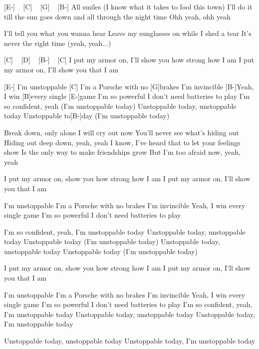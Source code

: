[E-] ~ [C] ~ [G] ~ [B-]
 All smiles
(I know what it takes to fool this town)
I'll do it till the sun goes down and all through the night time
Ohh yeah, ohh yeah

I'll tell you what you wanna hear
Leave my sunglasses on while I shed a tear
It's never the right time (yeah, yeah...)

[C] ~ [D] ~ [B-] ~ [C]
I put my armor on, I'll show you how strong how I am
I put my armor on, I'll show you that I am

[E-]
I'm unstoppable
[C]
I'm a Porsche with no [G]brakes
I'm invincible [B-]Yeah, I win [B]every single [E-]game
I'm so powerful
I don't need batteries to play
I'm so confident, yeah (I'm unstoppable today)
Unstoppable today, unstoppable today
Unstoppable to[B-]day (I'm unstoppable today)


Break down, only alone I will cry out now
You’ll never see what’s hiding out
Hiding out deep down, yeah, yeah
I know, I’ve heard that to let your feelings show
Is the only way to make friendships grow
But I’m too afraid now, yeah, yeah

I put my armor on, show you how strong how I am
I put my armor on, I'll show you that I am

I'm unstoppable
I'm a Porsche with no brakes
I'm invincible
Yeah, I win every single game
I'm so powerful
I don't need batteries to play

I'm so confident, yeah, I'm unstoppable today
Unstoppable today, unstoppable today
Unstoppable today (I'm unstoppable today)
Unstoppable today, unstoppable today
Unstoppable today (I'm unstoppable today)

I put my armor on, show you how strong how I am
I put my armor on, I'll show you that I am

I'm unstoppable
I'm a Porsche with no brakes
I'm invincible
Yeah, I win every single game
I'm so powerful
I don't need batteries to play
I'm so confident, yeah, I'm unstoppable today
Unstoppable today, unstoppable today
Unstoppable today, I'm unstoppable today

Unstoppable today, unstoppable today
Unstoppable today, I'm unstoppable today 